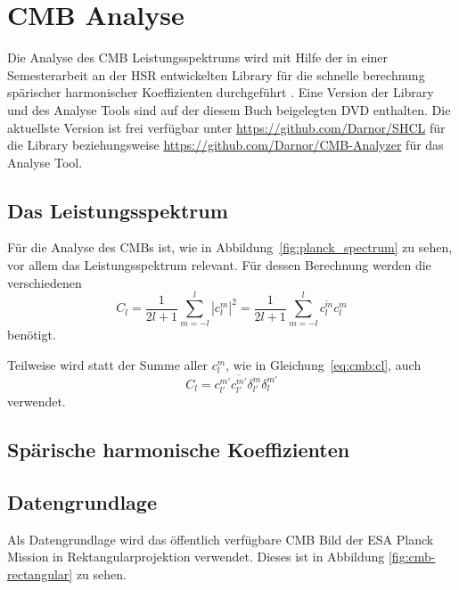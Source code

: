 \section{CMB Analyse}

Die Analyse des CMB Leistungsspektrums wird mit Hilfe der in einer 
Semesterarbeit an der HSR entwickelten Library für die schnelle berechnung 
spärischer harmonischer Koeffizienten durchgeführt \cite{SAPatzen}. Eine 
Version der Library und des Analyse Tools sind auf der diesem Buch beigelegten 
DVD enthalten. Die aktuellste Version ist frei verfügbar unter 
\url{https://github.com/Darnor/SHCL} für die Library beziehungsweise 
\url{https://github.com/Darnor/CMB-Analyzer} für das Analyse Tool.

\subsection{Das Leistungsspektrum}

Für die Analyse des CMBs ist, wie in Abbildung~\ref{fig:planck_spectrum} zu 
sehen, vor allem das Leistungsspektrum relevant. Für dessen Berechnung werden 
die verschiedenen
\begin{equation}
	C_l = \frac{1}{2l + 1}\sum_{m=-l}^{l}|c_l^m|^2 = \frac{1}{2l + 
	1}\sum_{m=-l}^{l}\overline{c_l^{m}}c_l^m
	\label{eq:cmb:cl}
\end{equation}
benötigt.

Teilweise wird statt der Summe aller $c_l^m$, wie in Gleichung~\ref{eq:cmb:cl}, 
auch
\begin{equation*}
	C_l = c_{l'}^{m'}\overline{c_{l'}^{m'}}\delta_{l'}^m\delta_l^{m'}
\end{equation*}
verwendet.


\subsection{Spärische harmonische Koeffizienten}

\subsection{Datengrundlage}
Als Datengrundlage wird das öffentlich verfügbare CMB Bild der ESA Planck 
Mission in Rektangularprojektion \cite{cmb_public_equirectangular} 
verwendet. Dieses ist in Abbildung \ref{fig:cmb-rectangular} zu sehen.

